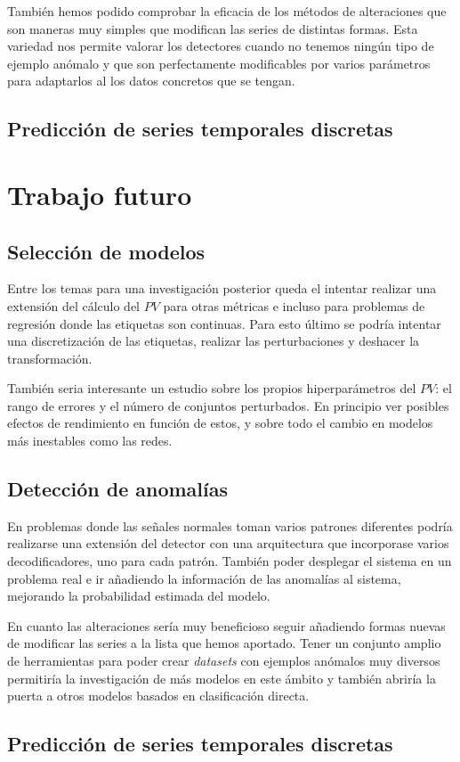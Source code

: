 También hemos podido comprobar la eficacia de los métodos de alteraciones que son maneras muy simples que modifican las series de distintas formas. Esta variedad nos permite valorar los detectores cuando no tenemos ningún tipo de ejemplo anómalo y que son perfectamente modificables por varios parámetros para adaptarlos al los datos concretos que se tengan.

\subsection{Predicción de series temporales discretas}

\section{Trabajo futuro}

\subsection{Selección de modelos}

Entre los temas para una investigación posterior queda el intentar realizar una extensión del cálculo del $PV$ para otras métricas e incluso para problemas de regresión donde las etiquetas son continuas. Para esto último se podría intentar una discretización de las etiquetas, realizar las perturbaciones y deshacer la transformación.

También seria interesante un estudio sobre los propios hiperparámetros del $PV$: el rango de errores y el número de conjuntos perturbados. En principio ver posibles efectos de rendimiento en función de estos, y sobre todo el cambio en modelos más inestables como las redes.

\subsection{Detección de anomalías}

En problemas donde las señales normales toman varios patrones diferentes podría realizarse una extensión del detector con una arquitectura que incorporase varios decodificadores, uno para cada patrón. También poder desplegar el sistema en un problema real e ir añadiendo la información de las anomalías al sistema, mejorando la probabilidad estimada del modelo.

En cuanto las alteraciones sería muy beneficioso seguir añadiendo formas nuevas de modificar las series a la lista que hemos aportado. Tener un conjunto amplio de herramientas para poder crear \emph{datasets} con ejemplos anómalos muy diversos permitiría la investigación de más modelos en este ámbito y también abriría la puerta a otros modelos basados en clasificación directa.

\subsection{Predicción de series temporales discretas}

\endinput

